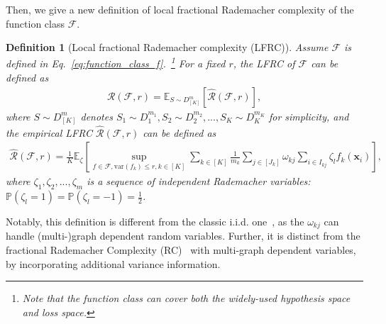 \documentclass{article}
\def\vx{{\mathbf{x}}}
\def\eE{\mathbb{E}}
\def\pP{\mathbb{P}}
\newtheorem{definition}{Definition}
\begin{document}
Then, we give a new definition of local fractional Rademacher complexity of the function class $\mathcal{F}$.
\begin{definition}[Local fractional Rademacher complexity (LFRC)]
\label{def: LFRC} 
Assume $\mathcal{F}$ is defined in Eq.~\eqref{eq:function_class_f}.~\footnote{Note that the function class can cover both the widely-used hypothesis space and loss space.} 
For a fixed $r$, the LFRC of $\mathcal{F}$ can be defined as
    \begin{align} \label{eq-def:LFRC-def}
        \mathcal{R} (\mathcal{F},r) = \eE _{S \sim D^m_{[K]}} [ \hat{\mathcal{R}} (\mathcal{F},r) ],
    \end{align}
where $S \sim D^m_{[K]}$ denotes $S_1 \sim D^{m_1}_1,S_2 \sim D^{m_2}_2,...,S_K \sim D^{m_K}_K$ for simplicity, and the empirical LFRC $\hat{\mathcal{R}} (\mathcal{F},r)$ can be defined as 
\begin{align} \label{eq: empirical LFRC}
      \hat{\mathcal{R}} (\mathcal{F},r)  
     =  \frac{1}{K} \eE _\zeta \left [ \sup _{f \in \mathcal{F},\mathrm{var}(f_k) \leq r, k \in [K]}  \sum_{k \in [K]} \frac{1}{m_k} \sum_{j \in [J_k]} \omega_{kj}  \sum_{i \in I_{kj}} \zeta_l f_k(\vx_i)\right ],
\end{align} 
where $\zeta_1,\zeta_2,...,\zeta_m$ is a sequence of independent Rademacher variables: $\pP (\zeta_l = 1) = \pP (\zeta_l = -1) = \frac{1}{2}$. 
\end{definition}
Notably, this definition is different from the classic i.i.d. one~\cite{Bartlett_2005}, as the $\omega_{kj}$ can handle (multi-)graph dependent random variables. Further, it is distinct from the fractional Rademacher Complexity (RC)~\cite{wu2023macro-auc} with multi-graph dependent variables, by incorporating additional variance information.
\end{document}
